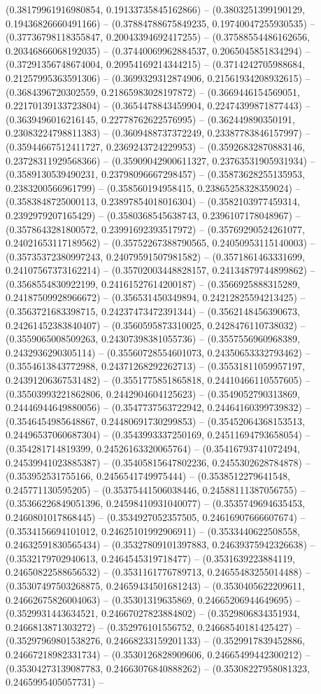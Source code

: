 (0.38179961916980854, 0.19133735845162866) -- (0.3803251399190129, 0.19436826660491166) -- (0.37884788675849235, 0.19740047255930535) -- (0.37736798118355847, 0.20043394692417255) -- (0.37588554486162656, 0.20346866068192035) -- (0.37440069962884537, 0.2065045851834294) -- (0.37291356748674004, 0.20954169214344215) -- (0.3714242705988684, 0.21257995363591306) -- (0.3699329312874906, 0.21561934208932615) -- (0.3684396720302559, 0.21865983028197872) -- (0.3669446154569051, 0.22170139133723804) -- (0.3654478843459904, 0.22474399871877443) -- (0.3639496016216145, 0.22778762622576995) -- (0.362449890350191, 0.23083224798811383) -- (0.3609488737372249, 0.23387783846157997) -- (0.35944667512411727, 0.2369243724229953) -- (0.35926832870883146, 0.23728311929568366) -- (0.35909042900611327, 0.23763531905931934) -- (0.3589130539490231, 0.23798096667298457) -- (0.35873628255135953, 0.2383200566961799) -- (0.358560194958415, 0.23865258328359024) -- (0.3583848725000113, 0.23897854018016304) -- (0.3582103977459314, 0.2392979207165429) -- (0.3580368545638743, 0.2396107178048967) -- (0.3578643281800572, 0.23991692393517972) -- (0.35769290524261077, 0.24021653117189562) -- (0.35752267388790565, 0.24050953115140003) -- (0.35735372380997243, 0.24079591507981582) -- (0.3571861463331699, 0.24107567373162214) -- (0.35702003448828157, 0.24134879744899862) -- (0.3568554830922199, 0.24161527614200187) -- (0.3566925888315289, 0.24187509928966672) -- (0.356531450349894, 0.24212825594213425) -- (0.3563721683398715, 0.24237473472391344) -- (0.3562148456390673, 0.24261452383840407) -- (0.3560595873310025, 0.2428476110738032) -- (0.3559065008509263, 0.24307398381055736) -- (0.3557556960968389, 0.2432936290305114) -- (0.35560728554601073, 0.24350653332793462) -- (0.3554613843772988, 0.24371268292262713) -- (0.35531811059957197, 0.24391206367531482) -- (0.3551775851865818, 0.24410466110557605) -- (0.35503993221862806, 0.2442904604125623) -- (0.3549052790313869, 0.24446944649880056) -- (0.3547737563722942, 0.24464160399739832) -- (0.3546454985648867, 0.24480691730299853) -- (0.35452064368153513, 0.24496537060687304) -- (0.3543993337250169, 0.24511694793658054) -- (0.354281714819399, 0.24526163320065764) -- (0.35416793741072494, 0.24539941023885387) -- (0.35405815647802236, 0.2455302628784878) -- (0.353952531755166, 0.2456541749975444) -- (0.3538512279641548, 0.245771130595205) -- (0.35375441506038446, 0.24588111387056755) -- (0.35366226849051396, 0.24598410931040077) -- (0.3535749694635453, 0.2460801017868445) -- (0.3534927052357505, 0.24616907666607674) -- (0.3534156694101012, 0.24625101992906911) -- (0.3533440622508558, 0.24632591830565434) -- (0.35327809101397883, 0.24639375942326638) -- (0.3532179702940613, 0.2464545319718477) -- (0.3531639223884119, 0.24650822588656532) -- (0.3531161776789713, 0.24655483255014488) -- (0.35307497503268875, 0.24659434501681243) -- (0.3530405622209611, 0.24662675826004063) -- (0.35301319635869, 0.24665206944649695) -- (0.3529931443634521, 0.24667027823884802) -- (0.3529806834351934, 0.2466813871303272) -- (0.352976101556752, 0.24668540181425427) -- (0.35297969801538276, 0.24668233159201133) -- (0.3529917839452886, 0.24667218982331734) -- (0.3530126828909606, 0.24665499442300212) -- (0.35304273139087783, 0.24663076840888262) -- (0.35308227958081323, 0.2465995405057731) -- 